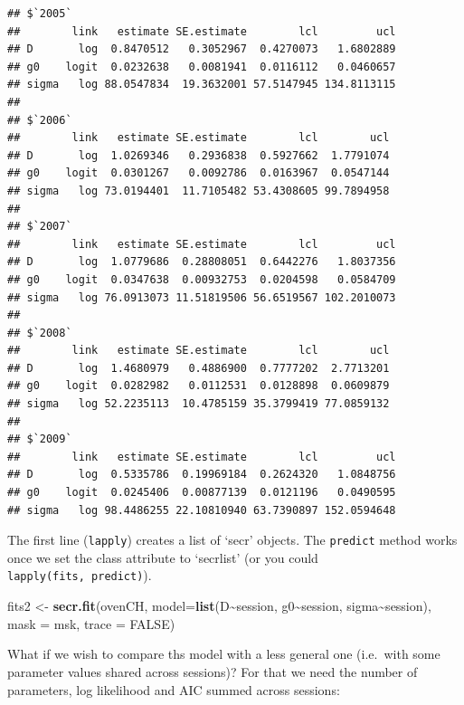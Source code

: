 \documentclass[
]{book}
\newenvironment{Shaded}{\begin{snugshade}}{\end{snugshade}}
\newcommand{\AttributeTok}[1]{\textcolor[rgb]{0.13,0.29,0.53}{#1}}
\newcommand{\ConstantTok}[1]{\textcolor[rgb]{0.56,0.35,0.01}{#1}}
\newcommand{\FunctionTok}[1]{\textcolor[rgb]{0.13,0.29,0.53}{\textbf{#1}}}
\newcommand{\NormalTok}[1]{#1}
\newcommand{\OtherTok}[1]{\textcolor[rgb]{0.56,0.35,0.01}{#1}}
\newcommand{\SpecialCharTok}[1]{\textcolor[rgb]{0.81,0.36,0.00}{\textbf{#1}}}
\begin{document}
\begin{verbatim}
## $`2005`
##        link   estimate SE.estimate        lcl         ucl
## D       log  0.8470512   0.3052967  0.4270073   1.6802889
## g0    logit  0.0232638   0.0081941  0.0116112   0.0460657
## sigma   log 88.0547834  19.3632001 57.5147945 134.8113115
## 
## $`2006`
##        link   estimate SE.estimate        lcl        ucl
## D       log  1.0269346   0.2936838  0.5927662  1.7791074
## g0    logit  0.0301267   0.0092786  0.0163967  0.0547144
## sigma   log 73.0194401  11.7105482 53.4308605 99.7894958
## 
## $`2007`
##        link   estimate SE.estimate        lcl         ucl
## D       log  1.0779686  0.28808051  0.6442276   1.8037356
## g0    logit  0.0347638  0.00932753  0.0204598   0.0584709
## sigma   log 76.0913073 11.51819506 56.6519567 102.2010073
## 
## $`2008`
##        link   estimate SE.estimate        lcl        ucl
## D       log  1.4680979   0.4886900  0.7777202  2.7713201
## g0    logit  0.0282982   0.0112531  0.0128898  0.0609879
## sigma   log 52.2235113  10.4785159 35.3799419 77.0859132
## 
## $`2009`
##        link   estimate SE.estimate        lcl         ucl
## D       log  0.5335786  0.19969184  0.2624320   1.0848756
## g0    logit  0.0245406  0.00877139  0.0121196   0.0490595
## sigma   log 98.4486255 22.10810940 63.7390897 152.0594648
\end{verbatim}

The first line (\texttt{lapply}) creates a list of `secr' objects. The \texttt{predict} method works once we set the class attribute to `secrlist' (or you could \texttt{lapply(fits,\ predict)}).

\begin{Shaded}
\begin{Highlighting}[]
\NormalTok{fits2 }\OtherTok{\textless{}{-}} \FunctionTok{secr.fit}\NormalTok{(ovenCH, }\AttributeTok{model=}\FunctionTok{list}\NormalTok{(D}\SpecialCharTok{\textasciitilde{}}\NormalTok{session, g0}\SpecialCharTok{\textasciitilde{}}\NormalTok{session, }
\NormalTok{    sigma}\SpecialCharTok{\textasciitilde{}}\NormalTok{session), }\AttributeTok{mask =}\NormalTok{ msk, }\AttributeTok{trace =} \ConstantTok{FALSE}\NormalTok{)}
\end{Highlighting}
\end{Shaded}

What if we wish to compare ths model with a less general one (i.e.~with some parameter values shared across sessions)? For that we need the number of parameters, log likelihood and AIC summed across sessions:
\end{document}
